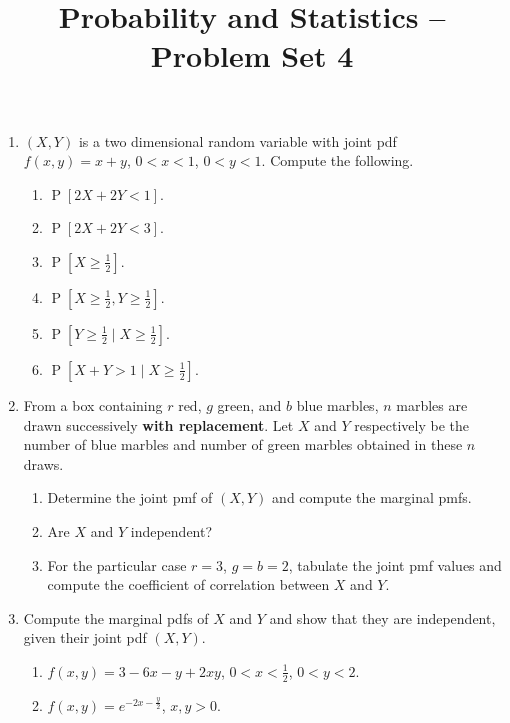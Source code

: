 \documentclass[svgnames]{amsart}
\title[]{Probability and Statistics -- Problem Set 4}
\DeclareMathOperator{\Prob}{P}
\begin{document}
\maketitle
\begin{enumerate}[leftmargin=*]
\item $(X, Y)$ is a two dimensional random variable with joint pdf $f(x, y) = x + y$, $0 < x < 1$, $0 < y < 1$. Compute the following.
\begin{enumerate}
	\item $\Prob[2X + 2Y < 1]$.
	\item $\Prob[2X + 2Y < 3]$.
	\item $\Prob[X \ge \frac 1 2]$.
	\item $\Prob[X \ge \frac 1 2, Y \ge \frac 1 2]$.
	\item $\Prob[Y \ge \frac 1 2 \mid X \ge \frac 1 2]$.
	\item $\Prob[X + Y > 1 \mid X \ge \frac 1 2]$.
\end{enumerate}

\item From a box containing $r$ red, $g$ green, and $b$ blue marbles, $n$ marbles are drawn successively \textbf{with replacement}. Let $X$ and $Y$ respectively be the number of blue marbles and number of green marbles obtained in these $n$ draws.
\begin{enumerate}
	\item Determine the joint pmf of $(X, Y)$ and compute the marginal pmfs.
	\item Are $X$ and $Y$ independent?
	\item For the particular case $r = 3$, $g = b = 2$, tabulate the joint pmf values and compute the coefficient of correlation between $X$ and $Y$.
\end{enumerate}

\item Compute the marginal pdfs of $X$ and $Y$ and show that they are independent, given their joint pdf $(X, Y)$.
\begin{enumerate}
	\item $f(x, y) = 3 - 6x - y + 2xy$, $0 < x < \frac 1 2$, $0 < y < 2$.
	\item $f(x, y) = e^{-2x - \frac y 2}$, $x, y > 0$.
\end{enumerate}


\end{enumerate}
\end{document}
